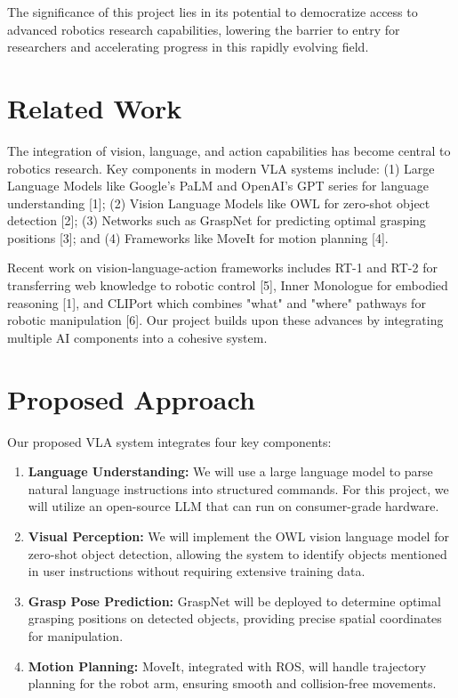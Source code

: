 \documentclass{article}
\begin{document}
The significance of this project lies in its potential to democratize access to advanced robotics research capabilities, lowering the barrier to entry for researchers and accelerating progress in this rapidly evolving field.

\section{Related Work}

The integration of vision, language, and action capabilities has become central to robotics research. Key components in modern VLA systems include: (1) Large Language Models like Google's PaLM and OpenAI's GPT series for language understanding [1]; (2) Vision Language Models like OWL for zero-shot object detection [2]; (3) Networks such as GraspNet for predicting optimal grasping positions [3]; and (4) Frameworks like MoveIt for motion planning [4].

Recent work on vision-language-action frameworks includes RT-1 and RT-2 for transferring web knowledge to robotic control [5], Inner Monologue for embodied reasoning [1], and CLIPort which combines "what" and "where" pathways for robotic manipulation [6]. Our project builds upon these advances by integrating multiple AI components into a cohesive system.

\section{Proposed Approach}

Our proposed VLA system integrates four key components:

\begin{enumerate}
    \item \textbf{Language Understanding:} We will use a large language model to parse natural language instructions into structured commands. For this project, we will utilize an open-source LLM that can run on consumer-grade hardware.
    
    \item \textbf{Visual Perception:} We will implement the OWL vision language model for zero-shot object detection, allowing the system to identify objects mentioned in user instructions without requiring extensive training data.
    
    \item \textbf{Grasp Pose Prediction:} GraspNet will be deployed to determine optimal grasping positions on detected objects, providing precise spatial coordinates for manipulation.
    
    \item \textbf{Motion Planning:} MoveIt, integrated with ROS, will handle trajectory planning for the robot arm, ensuring smooth and collision-free movements.
\end{enumerate}
\end{document}

